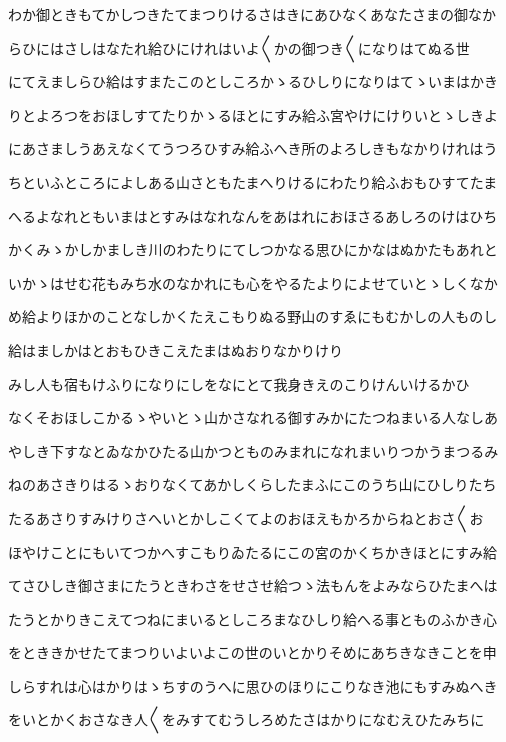 \documentclass[a4paper,11pt,landscape]{ltjtarticle}
\begin{document}
わか御ときもてかしつきたてまつりけるさはきにあひなくあなたさまの御なか
\par\medskip
らひにはさしはなたれ給ひにけれはいよ〱かの御つき〱になりはてぬる世
\par\medskip
にてえましらひ給はすまたこのとしころかゝるひしりになりはてゝいまはかき
\par\medskip
りとよろつをおほしすてたりかゝるほとにすみ給ふ宮やけにけりいとゝしきよ
\par\medskip
にあさましうあえなくてうつろひすみ給ふへき所のよろしきもなかりけれはう
\par\medskip
ちといふところによしある山さともたまへりけるにわたり給ふおもひすてたま
\par\medskip
へるよなれともいまはとすみはなれなんをあはれにおほさるあしろのけはひち
\par\medskip
かくみゝかしかましき川のわたりにてしつかなる思ひにかなはぬかたもあれと
\par\medskip
いかゝはせむ花もみち水のなかれにも心をやるたよりによせていとゝしくなか
\par\medskip
め給よりほかのことなしかくたえこもりぬる野山のすゑにもむかしの人ものし
\par\medskip
給はましかはとおもひきこえたまはぬおりなかりけり
\par\medskip
みし人も宿もけふりになりにしをなにとて我身きえのこりけんいけるかひ
\par\medskip
なくそおほしこかるゝやいとゝ山かさなれる御すみかにたつねまいる人なしあ
\par\medskip
やしき下すなとゐなかひたる山かつとものみまれになれまいりつかうまつるみ
\par\medskip
ねのあさきりはるゝおりなくてあかしくらしたまふにこのうち山にひしりたち
\par\medskip
たるあさりすみけりさへいとかしこくてよのおほえもかろからねとおさ〱お
\par\medskip
ほやけことにもいてつかへすこもりゐたるにこの宮のかくちかきほとにすみ給
\par\medskip
てさひしき御さまにたうときわさをせさせ給つゝ法もんをよみならひたまへは
\par\medskip
たうとかりきこえてつねにまいるとしころまなひしり給へる事とものふかき心
\par\medskip
をとききかせたてまつりいよいよこの世のいとかりそめにあちきなきことを申
\par\medskip
しらすれは心はかりはゝちすのうへに思ひのほりにこりなき池にもすみぬへき
\par\medskip
をいとかくおさなき人〱をみすてむうしろめたさはかりになむえひたみちに
\end{document}
